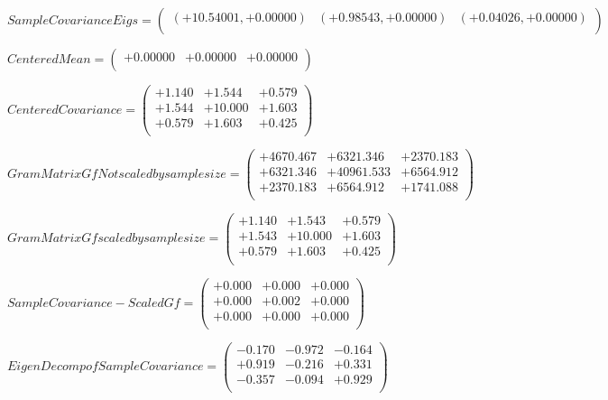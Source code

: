 \documentclass[9pt]{article}
\theoremstyle{plain}
\theoremstyle{definition}
\theoremstyle{remark}
\numberwithin{equation}{section}
\begin{document}
$Sample Covariance Eigs = \left(
\begin{array}{
ccc}
(+10.54001,+0.00000) & (+0.98543,+0.00000) & (+0.04026,+0.00000) \\
\end{array}
\right)$ \newline 

$Centered Mean = \left(
\begin{array}{
ccc}
+0.00000 & +0.00000 & +0.00000 \\
\end{array}
\right)$ \newline 

$Centered Covariance = \left(
\begin{array}{
ccc}
+1.140 & +1.544 & +0.579 \\
+1.544 & +10.000 & +1.603 \\
+0.579 & +1.603 & +0.425 \\
\end{array}
\right)$ \newline 

$Gram Matrix Gf Not scaled by sample size = \left(
\begin{array}{
ccc}
+4670.467 & +6321.346 & +2370.183 \\
+6321.346 & +40961.533 & +6564.912 \\
+2370.183 & +6564.912 & +1741.088 \\
\end{array}
\right)$ \newline 

$Gram Matrix Gf  scaled by sample size = \left(
\begin{array}{
ccc}
+1.140 & +1.543 & +0.579 \\
+1.543 & +10.000 & +1.603 \\
+0.579 & +1.603 & +0.425 \\
\end{array}
\right)$ \newline 

$SampleCovariance - Scaled Gf = \left(
\begin{array}{
ccc}
+0.000 & +0.000 & +0.000 \\
+0.000 & +0.002 & +0.000 \\
+0.000 & +0.000 & +0.000 \\
\end{array}
\right)$ \newline 

$EigenDecomp of SampleCovariance = \left(
\begin{array}{
ccc}
-0.170 & -0.972 & -0.164 \\
+0.919 & -0.216 & +0.331 \\
-0.357 & -0.094 & +0.929 \\
\end{array}
\right)$ \newline 
\end{document}
